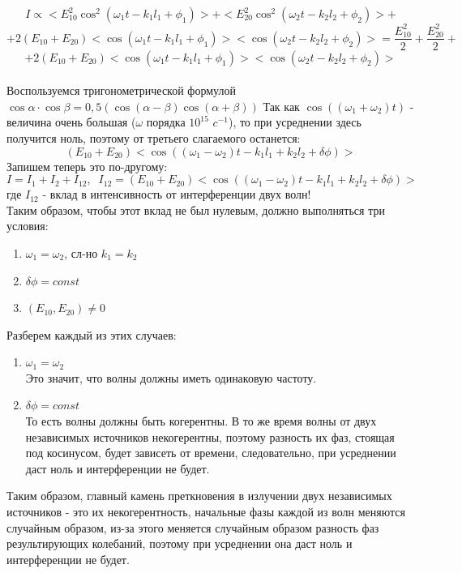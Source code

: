 \documentclass[a4paper]{article}
\begin{document}
$$I \propto <E_{10}^2\cos^2(\omega_1 t - k_1l_1 + \phi_1)> + <E_{20}^2\cos^2(\omega_2 t - k_2l_2 + \phi_2)> + $$
$$ + 2(E_{10} + E_{20})<\cos(\omega_1 t - k_1l_1 + \phi_1)><\cos(\omega_2 t - k_2l_2 + \phi_2)> = \frac{E_{10}^2}{2} + \frac{E_{20}^2}{2} + $$ $$+2(E_{10} + E_{20})<\cos(\omega_1 t - k_1l_1 + \phi_1)><\cos(\omega_2 t - k_2l_2 + \phi_2)>$$ 
\\
Воспользуемся тригонометрической формулой $\cos \alpha \cdot \cos \beta = 0,5(\cos (\alpha - \beta) \cos (\alpha + \beta))$
Так как $\cos ((\omega_1 + \omega_2)t)$ - величина очень большая ($\omega$ порядка $10^15$ $c^{-1}$), то при усреднении здесь получится ноль, поэтому от третьего слагаемого останется:
$$(E_{10} + E_{20})<\cos((\omega_1 - \omega_2)t - k_1l_1 + k_2l_2 + \delta \phi)>$$
Запишем теперь это по-другому:
\begin{equation}
I = I_1 + I_2 + I_{12}, \; \; I_{12} = (E_{10} + E_{20})<\cos((\omega_1 - \omega_2)t - k_1l_1 + k_2l_2 + \delta \phi)>
\label{simple}
\end{equation}
где $I_{12}$ - вклад в интенсивность от интерференции двух волн!\\
Таким образом, чтобы этот вклад не был нулевым, должно выполняться три условия:
\begin{enumerate}
\item $\omega_1 = \omega_2$, сл-но $k_1 = k_2$
\item $\delta \phi = const$
\item $(E_{10}, E_{20})\neq 0$
\end{enumerate}
Разберем каждый из этих случаев:
\begin{enumerate}
\item $\omega_1 = \omega_2$\\
Это значит, что волны должны иметь одинаковую частоту.\\
\item $\delta \phi = const$\\
То есть волны должны быть когерентны. В то же время волны от двух независимых источников некогерентны, поэтому разность их фаз, стоящая под косинусом, будет зависеть от времени, следовательно, при усреднении даст ноль и интерференции не будет.
\end{enumerate}
Таким образом, главный камень преткновения в излучении двух независимых источников - это их некогерентность, начальные фазы каждой из волн меняются случайным образом, из-за этого меняется случайным образом разность фаз результирующих колебаний, поэтому при усреднении она даст ноль и интерференции не будет.
\end{document}
